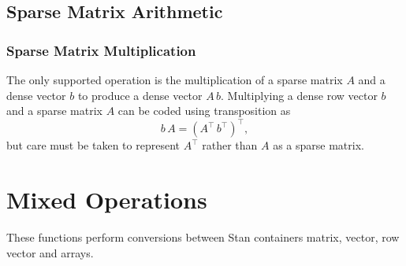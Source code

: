 \section{Sparse Matrix Arithmetic}

\subsection{Sparse Matrix Multiplication}

The only supported operation is the multiplication of a sparse matrix
$A$ and a dense vector $b$ to produce a dense vector $A\,b$.
Multiplying a dense row vector $b$ and a sparse matrix $A$ 
can be coded using transposition as
\[
b \, A = (A^{\top} \, b^{\top})^{\top},
\]
but care must be taken to represent $A^{\top}$ rather than $A$ as a
sparse matrix.

\begin{description}
\end{description}



\chapter{Mixed Operations}\label{mixed-operations.chapter}

\noindent These functions perform conversions between Stan containers matrix,
vector, row vector and arrays.

